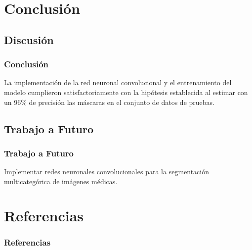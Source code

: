\documentclass{beamer}
\begin{document}
\section{Conclusión}
\subsection{Discusión}
\begin{frame}
    \frametitle{Conclusión}
    La implementación de la red neuronal convolucional y el entrenamiento del modelo cumplieron satisfactoriamente con la hipótesis establecida al estimar con un 96\% de precisión las máscaras en el conjunto de datos de pruebas.
\end{frame}

\subsection{Trabajo a Futuro}
\begin{frame}
    \frametitle{Trabajo a Futuro}
    Implementar redes neuronales convolucionales para la segmentación multicategórica de imágenes médicas.
\end{frame}

\section{Referencias}
\begin{frame}[allowframebreaks]
    \footnotesize
    \frametitle{Referencias}
    
    
    
    
\end{frame}
\end{document}

